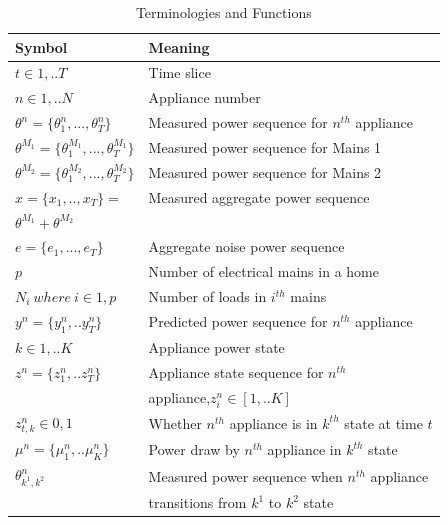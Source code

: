 \documentclass[conference]{IEEEtran}
\begin{document}
\begin{table}
\caption{Terminologies and Functions}
\label{tab:terms}
\begin{tabular}{|l|l|}
\hline
Symbol&Meaning\\[0.1cm]
\hline
$t\in {1,..T}$& Time slice\\[0.1cm]
\hline
$n\in{1,..N}$ & Appliance number\\[0.1cm]
\hline
$\theta^n=\{\theta_1^n,...,\theta_T^n\}$ & Measured power sequence for $n^{th}$ appliance\\[0.1cm]
\hline
$\theta^{M_1}=\{\theta_1^{M_1},...,\theta_T^{M_1}\}$ & Measured power sequence for Mains 1\\[0.1cm]
\hline
$\theta^{M_2}=\{\theta_1^{M_2},...,\theta_T^{M_2}\}$ & Measured power sequence for Mains 2\\[0.1cm]
\hline
$x=\{ x_1,..,x_T\}=$ & Measured aggregate power sequence\\[0.1cm]
$\theta^{M_1}+\theta^{M_2}$ &\\[0.1cm]
\hline
$e=\{e_1,...,e_T\}$ & Aggregate noise power sequence\\[0.1cm]
\hline
$p$ & Number of electrical mains in a home\\[0.1cm]
\hline
$N_i \:where\:i \in {1,p}$ & Number of loads in $i^{th}$ mains\\[0.1cm]
\hline
$y^n=\{y_1^n,..y_T^n\}$ & Predicted power sequence for $n^{th}$ appliance\\[0.1cm]
\hline
$k\in {1,..K}$ & Appliance power state\\[0.1cm]
\hline
$z^n=\{z_1^n,..z_T^n\}$ & Appliance state sequence for $n^{th}$ \\[0.1cm]
& appliance,$z_i^n \in [1,..K]$\\[0.1cm]
\hline
$z_{t,k}^n \in{0,1}$ & Whether $n^{th}$ appliance is in $k^{th}$ state at time $t$\\[0.1cm]
\hline 
$\mu^n=\{\mu_1^n,..\mu_K^n\}$ & Power draw by $n^{th}$ appliance in $k^{th}$ state\\[0.1cm]
\hline
$\theta^n_{k^1,k^2}$& Measured power sequence when $n^{th}$ appliance \\[0.1cm]
& transitions from $k^1$ to $k^2$ state\\[0.1cm]

\end{tabular}
\end{table}
\end{document}
